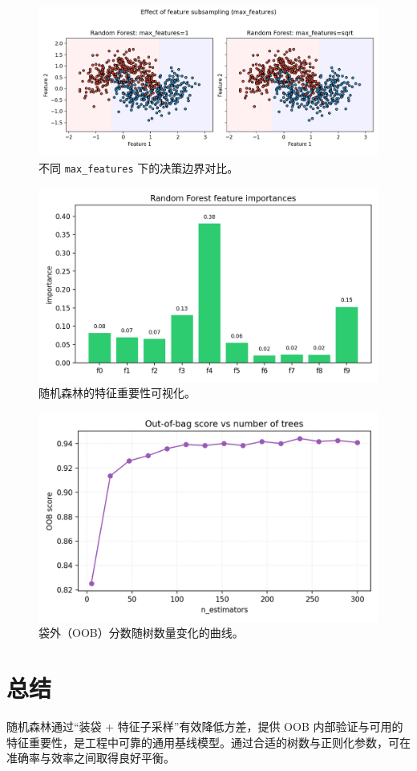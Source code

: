 \documentclass[UTF8,zihao=-4]{ctexart}
\begin{document}
\begin{figure}[H]
  \centering
  \includegraphics[width=0.95\linewidth]{rf_max_features_compare.png}
  \caption{不同 \texttt{max\_features} 下的决策边界对比。}
  \label{fig:rf_mf_cn}
\end{figure}
\FloatBarrier

\begin{figure}[H]
  \centering
  \includegraphics[width=0.85\linewidth]{rf_feature_importances.png}
  \caption{随机森林的特征重要性可视化。}
  \label{fig:rf_fi_cn}
\end{figure}
\FloatBarrier

\begin{figure}[H]
  \centering
  \includegraphics[width=0.85\linewidth]{rf_oob_curve.png}
  \caption{袋外（OOB）分数随树数量变化的曲线。}
  \label{fig:rf_oob_cn}
\end{figure}
\FloatBarrier

\section{总结}
随机森林通过“装袋 + 特征子采样”有效降低方差，提供 OOB 内部验证与可用的特征重要性，是工程中可靠的通用基线模型。通过合适的树数与正则化参数，可在准确率与效率之间取得良好平衡。
\end{document}

